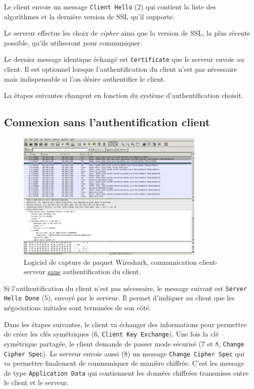 \documentclass[10pt,a4paper,titlepage]{article}
\begin{document}
Le client envoie un message \texttt{Client Hello} (2) qui contient la liste des algorithmes et la dernière version de SSL qu'il supporte.

Le serveur effectue les choix de \emph{cipher} ainsi que la version de SSL, la plus récente possible, qu'ils utiliseront pour communiquer.

Le dernier message identique échangé est \texttt{Certificate} que le serveur envoie au client. Il est optionnel lorsque l'authentification du client n'est pas nécessaire mais indispensable si l'on désire authentifier le client.

La étapes suivantes changent en fonction du système d'authentification choisit.

\subsection{Connexion sans l'authentification client}

\begin{figure}[htbp]
   \begin{center}
      \includegraphics[width=345px]{img/wireshark-nouser-auth.png}
   \end{center}
   \caption{Logiciel de capture de paquet Wireshark, communication client-serveur \underline{sans} authentification du client.}
	\label{fig:wireshark-nouserauth}
\end{figure}

Si l'authentification du client n'est pas nécessaire, le message suivant est \texttt{Server Hello Done} (5), envoyé par le serveur. Il permet d'indiquer au client que les négociations initiales sont terminées de son côté. 

Dans les étapes suivantes, le client va échanger des informations pour permettre de créer les clés symétriques (6, \texttt{Client Key Exchange}). Une fois la clé symétrique partagée, le client demande de passer mode sécurisé (7 et 8, \texttt{Change Cipher Spec}). Le serveur envoie aussi (8) un message \texttt{Change Cipher Spec} qui va permettre finalement de communiquer de manière chiffrée. C'est les message de type \texttt{Application Data} qui contiennent les données chiffrées transmises entre le client et le serveur.
\end{document}
